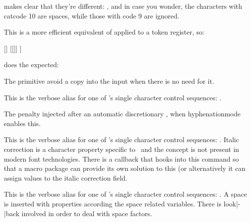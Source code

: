 \typebuffer

makes clear that they're different: \inlinebuffer, and in case you wonder, the
characters with catcode 10 are spaces, while those with code 9 are ignored.

\stopnewprimitive

\startnewprimitive[title={\prm {expandtoks}}]

This is a more efficient equivalent of  applied to a token register,
so:

\startbuffer
{}
\edef\TestA{[\the       \scratchtoks]}
\edef\TestB{[\expandtoks\scratchtoks]}
[\the       \scratchtoks] [\TestA] \meaning\TestA
[\expandtoks\scratchtoks] [\TestB] \meaning\TestB
\stopbuffer

\typebuffer

does the expected:

\startlines
\getbuffer
\stoplines

The  primitive avoid a copy into the input when there is no
need for it.

\stopnewprimitive

\startnewprimitive[title={\prm {explicitdiscretionary}}]

This is the verbose alias for one of \TEX's single character control sequences:
\type {\-}.

\stopnewprimitive

\startnewprimitive[title={\prm {explicithyphenpenalty}}]

The penalty injected after an automatic discretionary \type {\-}, when \prm
{hyphenationmode} enables this.

\stopnewprimitive

\startnewprimitive[title={\prm {explicititaliccorrection}}]

This is the verbose alias for one of \TEX's single character control sequences:
\type {\/}. Italic correction is a character property specific to \TEX\ and the
concept is not present in modern font technologies. There is a callback that
hooks into this command so that a macro package can provide its own solution
to this (or alternatively it can assign values to the italic correction field.

\stopnewprimitive

\startnewprimitive[title={\prm {explicitspace}}]

This is the verbose alias for one of \TEX's single character control sequences:
\type {\ }. A space is inserted with properties according the space related
variables. There is look|-|back involved in order to deal with space factors.

